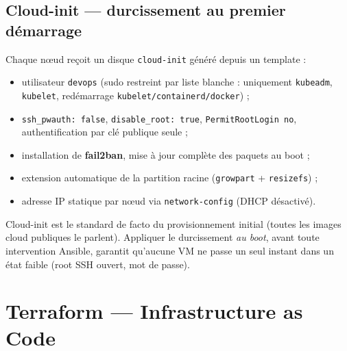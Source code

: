 \documentclass[11pt,a4paper]{article}
\begin{document}
\subsection{Cloud-init --- durcissement au premier démarrage}
Chaque nœud reçoit un disque \texttt{cloud-init} généré depuis un template :
\begin{itemize}[itemsep=1pt]
  \item utilisateur \texttt{devops} (sudo restreint par liste blanche : uniquement \texttt{kubeadm}, \texttt{kubelet}, redémarrage \texttt{kubelet/containerd/docker}) ;
  \item \texttt{ssh\_pwauth: false}, \texttt{disable\_root: true}, \texttt{PermitRootLogin no}, authentification par clé publique seule ;
  \item installation de \textbf{fail2ban}, mise à jour complète des paquets au boot ;
  \item extension automatique de la partition racine (\texttt{growpart} + \texttt{resizefs}) ;
  \item adresse IP statique par nœud via \texttt{network-config} (DHCP désactivé).
\end{itemize}

\begin{whybox}
Cloud-init est le standard de facto du provisionnement initial (toutes les images cloud publiques le parlent). Appliquer le durcissement \emph{au boot}, avant toute intervention Ansible, garantit qu'aucune VM ne passe un seul instant dans un état faible (root SSH ouvert, mot de passe).
\end{whybox}

\section{Terraform --- Infrastructure as Code}
\end{document}
